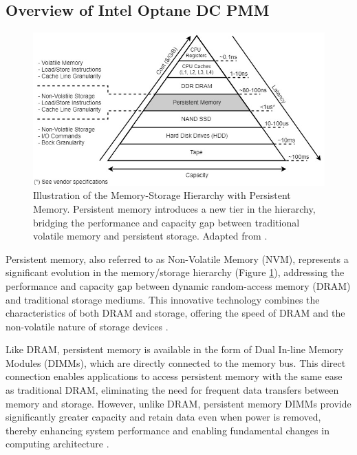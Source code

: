 \subsection{Overview of Intel Optane DC PMM}

\begin{figure}[ht]
    \centering
    \includegraphics[scale=0.6]{images/pmem_storage_pyramid.jpg}
    \caption[Memory-Storage Hierarchy with Persistent Memory]{Illustration of the Memory-Storage Hierarchy with Persistent Memory. Persistent memory introduces a new tier in the hierarchy, bridging the performance and capacity gap between traditional volatile memory and persistent storage. Adapted from \cite{Introduc86:online}.}
    \label{fig:pmem_storage_pyramid}
\end{figure}

Persistent memory, also referred to as Non-Volatile Memory (NVM), represents a significant evolution in the memory/storage hierarchy (Figure \ref{fig:pmem_storage_pyramid}), addressing the performance and capacity gap between dynamic random-access memory (DRAM) and traditional storage mediums. This innovative technology combines the characteristics of both DRAM and storage, offering the speed of DRAM and the non-volatile nature of storage devices \cite{scargall2020pmem}.

Like DRAM, persistent memory is available in the form of Dual In-line Memory Modules (DIMMs), which are directly connected to the memory bus. This direct connection enables applications to access persistent memory with the same ease as traditional DRAM, eliminating the need for frequent data transfers between memory and storage. However, unlike DRAM, persistent memory DIMMs provide significantly greater capacity and retain data even when power is removed, thereby enhancing system performance and enabling fundamental changes in computing architecture \cite{rudoff2017persistent,scargall2020pmem}.

